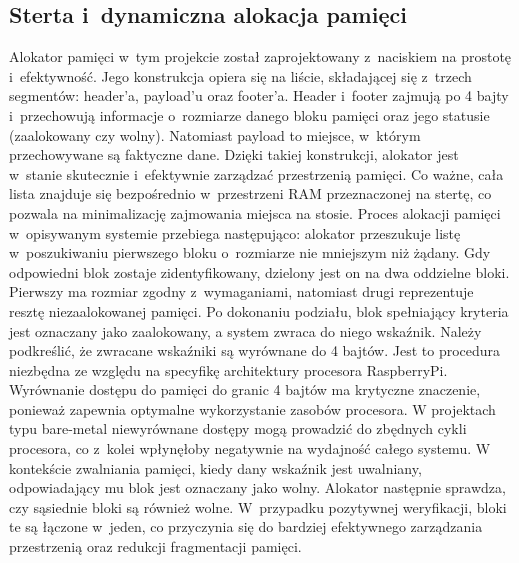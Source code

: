 \documentclass[shortabstract]{iithesis}
\begin{document}
\subsection{Sterta i~dynamiczna alokacja pamięci}
Alokator pamięci w~tym projekcie został zaprojektowany z~naciskiem na prostotę i~efektywność. Jego konstrukcja opiera się na liście, składającej się z~trzech segmentów: header'a, payload'u oraz footer'a. Header i~footer zajmują po 4 bajty i~przechowują informacje o~rozmiarze danego bloku pamięci oraz jego statusie (zaalokowany czy wolny). Natomiast payload to miejsce, w~którym przechowywane są faktyczne dane. Dzięki takiej konstrukcji, alokator jest w~stanie skutecznie i~efektywnie zarządzać przestrzenią pamięci. Co ważne, cała lista znajduje się bezpośrednio w~przestrzeni RAM przeznaczonej na stertę, co pozwala na minimalizację zajmowania miejsca na stosie. 
Proces alokacji pamięci w~opisywanym systemie przebiega następująco: alokator przeszukuje listę w~poszukiwaniu pierwszego bloku o~rozmiarze nie mniejszym niż żądany. Gdy odpowiedni blok zostaje zidentyfikowany, dzielony jest on na dwa oddzielne bloki. Pierwszy ma rozmiar zgodny z~wymaganiami, natomiast drugi reprezentuje resztę niezaalokowanej pamięci. Po dokonaniu podziału, blok spełniający kryteria jest oznaczany jako zaalokowany, a system zwraca do niego wskaźnik.
Należy podkreślić, że zwracane wskaźniki są wyrównane do 4 bajtów. Jest to procedura niezbędna ze względu na specyfikę architektury procesora RaspberryPi. Wyrównanie dostępu do pamięci do granic 4 bajtów ma krytyczne znaczenie, ponieważ zapewnia optymalne wykorzystanie zasobów procesora. W projektach typu bare-metal niewyrównane dostępy mogą prowadzić do zbędnych cykli procesora, co z~kolei wpłynęłoby negatywnie na wydajność całego systemu.
W kontekście zwalniania pamięci, kiedy dany wskaźnik jest uwalniany, odpowiadający mu blok jest oznaczany jako wolny. Alokator następnie sprawdza, czy sąsiednie bloki są również wolne. W~przypadku pozytywnej weryfikacji, bloki te są łączone w~jeden, co przyczynia się do bardziej efektywnego zarządzania przestrzenią oraz redukcji fragmentacji pamięci.
\end{document}
